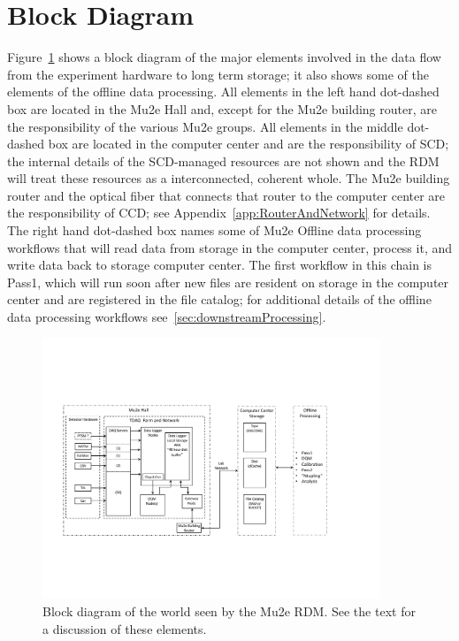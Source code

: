 \section{Block Diagram}
\label{sec:BlockDiagram}

Figure~\ref{fig:blockdiagram} shows a block diagram of the major elements involved
in the data flow from the experiment hardware to long term storage; it also shows
some of the elements of the offline data processing.
All elements in the left hand dot-dashed box are located in the Mu2e Hall
and, except for the Mu2e building router, are the responsibility of the various Mu2e groups.
All elements in the middle dot-dashed box are located in the computer center
and are the responsibility of SCD; the internal details of the SCD-managed resources
are not shown and the RDM will treat these resources as a interconnected, coherent whole.
The Mu2e building router and the optical fiber that connects that router
to the computer center are the responsibility of CCD;
see Appendix~\ref{app:RouterAndNetwork} for details.
The right hand dot-dashed box names some of Mu2e Offline data processing workflows
that will read data from storage in the computer center, process it,
and write data back to storage computer center.
The first workflow in this chain is Pass1, which will run soon after new files
are resident on storage in the computer center and are registered in the file catalog;
for additional details of the offline data processing workflows see~\ref{sec:downstreamProcessing}.

\begin{figure}[tbp]
\centering
\includegraphics[width=0.9\textwidth]{figures/interface_with_TDAQ.pdf}
\caption[Block diagram of interfaces seen by the Mu2e RDM]{
  Block diagram of the world seen by the Mu2e RDM.
  See the text for a discussion of these elements.}
\label{fig:blockdiagram}
\end{figure}

